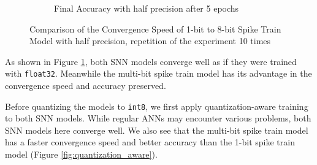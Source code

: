 \begin{figure}[!htpb]
\begin{subfigure}[H]{0.1\textwidth}
            \caption{Final Accuracy with half precision after 5 epochs}
        \end{subfigure}
        \caption{Comparison of the Convergence Speed of 1-bit to 8-bit Spike Train Model with half precision, repetition of the experiment 10 times}
        \label{fig:half_precision}
    \end{figure}

    As shown in Figure \ref{fig:half_precision}, both SNN models converge well as if they were trained with \verb|float32|. Meanwhile the multi-bit spike train model has its advantage in the convergence speed and accuracy preserved. 
    
    Before quantizing the models to \verb|int8|, we first apply quantization-aware training to both SNN models. While regular ANNs may encounter various problems, both SNN models here converge well. We also see that the multi-bit spike train model has a faster convergence speed and better accuracy than the 1-bit spike train model (Figure \ref{fig:quantization_aware}). 

